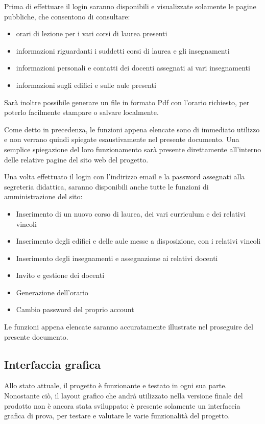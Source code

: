 \documentclass[11pt,a4paper]{article}
\begin{document}
Prima di effettuare il login saranno disponibili e visualizzate solamente le pagine pubbliche, che consentono di consultare:
\begin{itemize}
 \item orari di lezione per i vari corsi di laurea presenti
 \item informazioni riguardanti i suddetti corsi di laurea e gli insegnamenti
 \item informazioni personali e contatti dei docenti assegnati ai vari insegnamenti
 \item informazioni sugli edifici e sulle aule presenti
\end{itemize}
Sarà inoltre possibile generare un file in formato Pdf con l'orario richiesto, per poterlo facilmente stampare o salvare localmente.

Come detto in precedenza, le funzioni appena elencate sono di immediato utilizzo e non verrano quindi spiegate esaustivamente nel presente documento.
Una semplice spiegazione del loro funzionamento sarà presente direttamente all'interno delle relative pagine del sito web del progetto.

\bigskip
Una volta effettuato il login con l'indirizzo email e la password assegnati alla segreteria didattica, saranno disponibili anche tutte le funzioni di amministrazione del sito:
\begin{itemize}
 \item Inserimento di un nuovo corso di laurea, dei vari curriculum e dei relativi vincoli
 \item Inserimento degli edifici e delle aule messe a disposizione, con i relativi vincoli
 \item Inserimento degli insegnamenti e assegnazione ai relativi docenti
 \item Invito e gestione dei docenti
 \item Generazione dell'orario
 \item Cambio password del proprio account
\end{itemize}
Le funzioni appena elencate saranno accuratamente illustrate nel proseguire del presente documento.
\subsection{Interfaccia grafica}
Allo stato attuale, il progetto è funzionante e testato in ogni sua parte.
Nonostante ciò, il layout grafico che andrà utilizzato nella versione finale del prodotto non è ancora stata sviluppato: è presente solamente un interfaccia grafica di prova, per testare e valutare le varie funzionalità del progetto.
\end{document}
